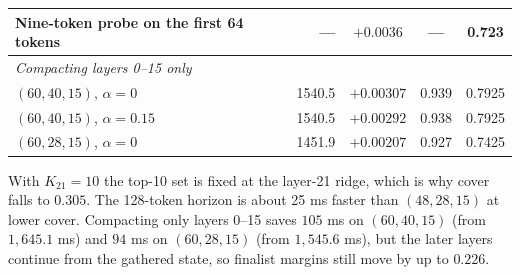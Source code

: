 \documentclass[11pt, a4paper]{article}
\begin{document}
\begin{table}[h]
\begin{tabular}{lrccc}
Nine-token probe on the first 64 tokens & --- & $+0.0036$ & --- & 0.723 \\
\midrule
\multicolumn{5}{l}{\emph{Compacting layers 0--15 only}} \\
$(60, 40, 15)$, $\alpha = 0$ & 1540.5 & $+0.00307$ & 0.939 & 0.7925 \\
$(60, 40, 15)$, $\alpha = 0.15$ & 1540.5 & $+0.00292$ & 0.938 & 0.7925 \\
$(60, 28, 15)$, $\alpha = 0$ & 1451.9 & $+0.00207$ & 0.927 & 0.7425 \\
\bottomrule
\end{tabular}
\end{table}

With $K_{21} = 10$ the top-10 set is fixed at the layer-21 ridge, which is why cover falls to $0.305$.
The 128-token horizon is about 25 ms faster than $(48, 28, 15)$ at lower cover.
Compacting only layers 0--15 saves $105$ ms on $(60, 40, 15)$ (from $1{,}645.1$ ms) and $94$ ms on $(60, 28, 15)$ (from $1{,}545.6$ ms), but the later layers continue from the gathered state, so finalist margins still move by up to $0.226$.
\end{document}
